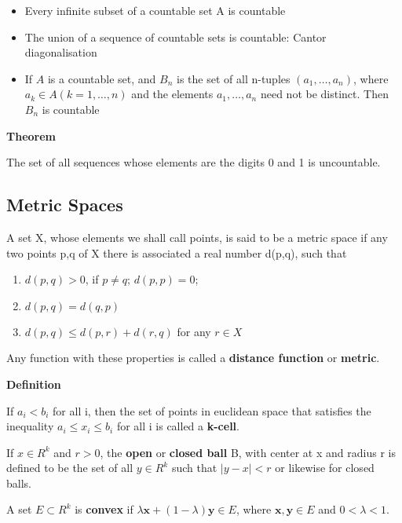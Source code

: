 \documentclass[11pt]{article}
\begin{document}
\begin{itemize}
\item Every infinite subset of a countable set A is countable

\item The union of a sequence of countable sets is countable: Cantor diagonalisation

\item If \(A\) is a countable set, and \(B_n\) is the set of all n-tuples \((a_1,\ldots,a_n)\), where \(a_k \in A (k = 1,\ldots,n)\) and the elements \(a_1, \ldots, a_n\) need not be distinct. Then \(B_n\) is countable
\end{itemize}

\textbf{Theorem}

The set of all sequences whose elements are the digits 0 and 1 is uncountable.

\subsection{Metric Spaces}
\label{sec:org00244a9}

A set X, whose elements we shall call points, is said to be a metric space if any two points p,q of X there is associated a real number d(p,q), such that

\begin{enumerate}
\item \(d(p,q) > 0\), if \(p \neq q\); \(d(p,p) = 0\);
\item \(d(p,q) = d(q,p)\)
\item \(d(p,q) \leq d(p,r) + d(r,q)\) for any \(r \in X\)
\end{enumerate}

Any function with these properties is called a \textbf{distance function} or \textbf{metric}.

\textbf{Definition}

If  \(a_i < b_i\) for all i, then the set of points in euclidean space that satisfies the inequality \(a_i \leq x_i \leq b_i\) for all i is called a \textbf{k-cell}.

If \(x \in R^k\) and \(r > 0\), the \textbf{open} or \textbf{closed ball} B, with center at x and radius r is defined to be the set of all \(y \in R^k\) such that \(\vert y - x \vert < r\) or likewise for closed balls.

A set \(E \subset R^k\) is \textbf{convex} if \(\lambda \bm{x} + (1-\lambda)\bm{y} \in E\), where \(\bm{x},\bm{y} \in E\) and \(0 < \lambda < 1\).
\end{document}
